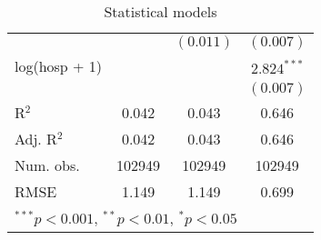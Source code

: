 \begin{table}
\begin{center}
\begin{tabular}{l c c c }
                             &                & $(0.011)$      & $(0.007)$      \\
log(hosp + 1)                &                &                & $2.824^{***}$  \\
                             &                &                & $(0.007)$      \\
\hline
R$^2$                        & 0.042          & 0.043          & 0.646          \\
Adj. R$^2$                   & 0.042          & 0.043          & 0.646          \\
Num. obs.                    & 102949         & 102949         & 102949         \\
RMSE                         & 1.149          & 1.149          & 0.699          \\
\hline
\multicolumn{4}{l}{\scriptsize{$^{***}p<0.001$, $^{**}p<0.01$, $^*p<0.05$}}
\end{tabular}
\caption{Statistical models}
\label{tab:fit_cpq}
\end{center}
\end{table}
